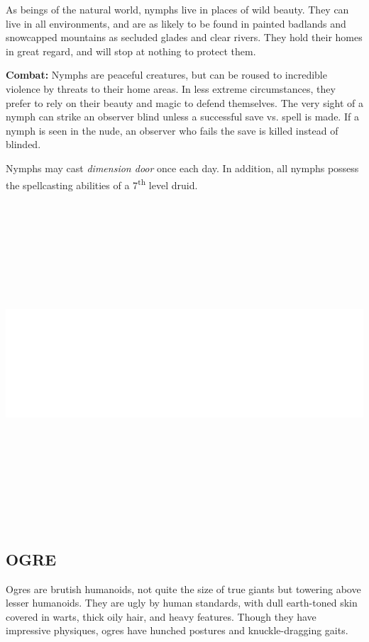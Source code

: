 \begin{multicols}{2}
As beings of the natural world, nymphs live in places of wild beauty. They can live in all environments, and are as likely to be found in painted badlands and snowcapped mountains as secluded glades and clear rivers. They hold their homes in great regard, and will stop at nothing to protect them.

\textbf{Combat:} Nymphs are peaceful creatures, but can be roused to incredible violence by threats to their home areas. In less extreme circumstances, they prefer to rely on their beauty and magic to defend themselves. The very sight of a nymph can strike an observer blind unless a successful save vs. spell is made. If a nymph is seen in the nude, an observer who fails the save is killed instead of blinded.

Nymphs may cast \textit{dimension door} once each day. In addition, all nymphs possess the spellcasting abilities of a 7\textsuperscript{th} level druid.

\noindent\includegraphics[width=\columnwidth, height=4.75in]{testblock.pdf}

\subsection{OGRE}

Ogres are brutish humanoids, not quite the size of true giants but towering above lesser humanoids. They are ugly by human standards, with dull earth-toned skin covered in warts, thick oily hair, and heavy features. Though they have impressive physiques, ogres have hunched postures and knuckle-dragging gaits.

\end{multicols}

